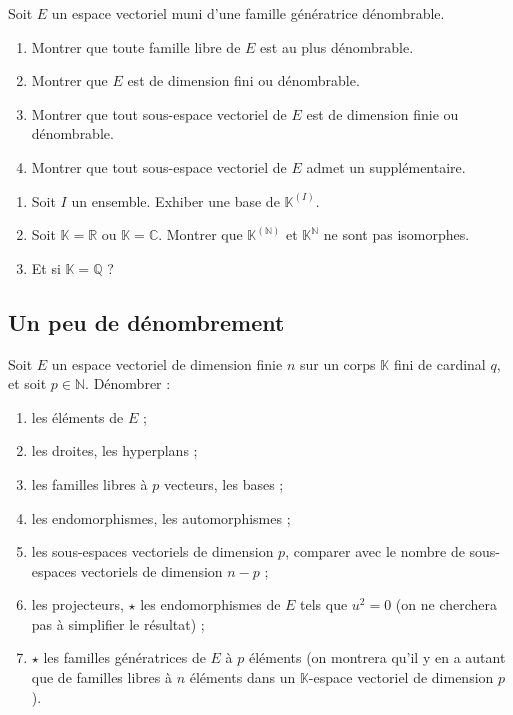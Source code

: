 \documentclass[french]{article}
\newcommand{\N}{\mathbb{N}}
\newcommand{\Q}{\mathbb{Q}}
\newcommand{\R}{\mathbb{R}}
\newcommand{\C}{\mathbb{C}}
\newcommand{\K}{\mathbb{K}}
\theoremstyle{plain}
\theoremstyle{definition}
\theoremstyle{remark}
\begin{document}
\begin{exo}
	Soit $E$ un espace vectoriel muni d'une famille génératrice dénombrable.
	\begin{enumerate}
		\item Montrer que toute famille libre de $E$ est au plus dénombrable.
		\item Montrer que $E$ est de dimension fini ou dénombrable.
		\item Montrer que tout sous-espace vectoriel de $E$ est de dimension finie ou dénombrable.
		\item Montrer que tout sous-espace vectoriel de $E$ admet un supplémentaire.
	\end{enumerate}
\end{exo}

\begin{exo}
	\begin{enumerate}
		\item Soit $I$ un ensemble. Exhiber une base de $\K^{(I)}$.
		\item Soit $\K=\R$ ou $\K=\C$. Montrer que $\K^{(\N)}$ et $\K^\N$ ne sont pas isomorphes.
		\item Et si $\K=\Q$ ?
	\end{enumerate}
\end{exo}

\subsection{Un peu de dénombrement}

Soit $E$ un espace vectoriel de dimension finie $n$ sur un corps $\K$ fini de cardinal $q$, et soit $p\in\N$. Dénombrer :
\begin{enumerate}
	\item les éléments de $E$ ;
	\item les droites, les hyperplans ;
	\item les familles libres à $p$ vecteurs, les bases ;
	\item les endomorphismes, les automorphismes ;
	\item les sous-espaces vectoriels de dimension $p$, comparer avec le nombre de sous-espaces vectoriels de dimension $n-p$ ;
	\item les projecteurs, $\star$ les endomorphismes de $E$ tels que $u^2=0$ (on ne cherchera pas à simplifier le résultat) ;
	\item $\star$ les familles génératrices de $E$ à $p$ éléments (on montrera qu'il y en a autant que de familles libres à $n$ éléments dans un $\K$-espace vectoriel de dimension $p$).
\end{enumerate}
	
\end{document}
